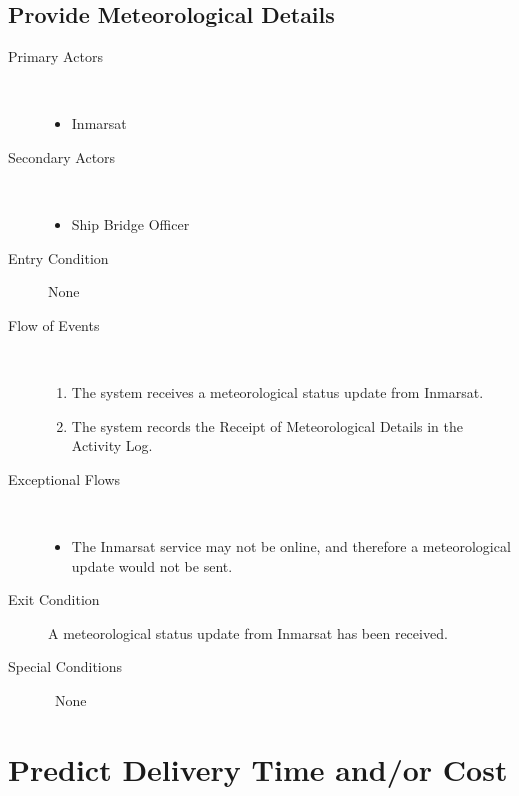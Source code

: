\documentclass[a4paper,10pt]{report}
\begin{document}
\section{Provide Meteorological Details}
\begin{description}
\item[Primary Actors] \
  \begin{itemize}
  \item Inmarsat
  \end{itemize}
\item[Secondary Actors] \
  \begin{itemize}
  \item Ship Bridge Officer
  \end{itemize}
\item[Entry Condition] None
  \item[Flow of Events] \
  \begin{enumerate}
  \item The system receives a meteorological status update from Inmarsat.
  \item The system records the Receipt of Meteorological Details in the Activity Log.
  \end{enumerate}
\item[Exceptional Flows] \
  \begin{itemize}
  \item The Inmarsat service may not be online, and therefore a meteorological update would not be sent.
  \end{itemize}
\item[Exit Condition]
  A meteorological status update from Inmarsat has been received.
\item[Special Conditions] \ None
\end{description}


\chapter{Predict Delivery Time and/or Cost}
\end{document}
